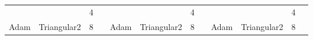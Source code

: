 \begin{table}[]
{\begin{tabular}{|ccll|ccll|ccll|}
\multicolumn{1}{|c|}{} &
  \multicolumn{1}{c|}{} &
  \multicolumn{1}{l|}{4} &
   &
  \multicolumn{1}{c|}{} &
  \multicolumn{1}{c|}{} &
  \multicolumn{1}{l|}{4} &
   &
  \multicolumn{1}{c|}{} &
  \multicolumn{1}{c|}{} &
  \multicolumn{1}{l|}{4} &
   \\ \cline{3-4} \cline{7-8} \cline{11-12} 
\multicolumn{1}{|c|}{\multirow{-6}{*}{Adam}} &
  \multicolumn{1}{c|}{\multirow{-3}{*}{Triangular2}} &
  \multicolumn{1}{l|}{8} &
   &
  \multicolumn{1}{c|}{\multirow{-6}{*}{Adam}} &
  \multicolumn{1}{c|}{\multirow{-3}{*}{Triangular2}} &
  \multicolumn{1}{l|}{8} &
   &
  \multicolumn{1}{c|}{\multirow{-6}{*}{Adam}} &
  \multicolumn{1}{c|}{\multirow{-3}{*}{Triangular2}} &
  \multicolumn{1}{l|}{8} &
   \\ \hline
\end{tabular}%
}
\end{table}






